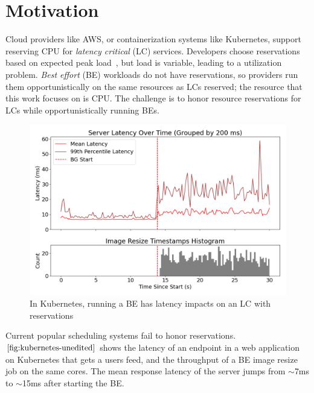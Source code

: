 \section{Motivation}

Cloud providers like AWS, or containerization systems like Kubernetes, support
reserving CPU for \textit{latency critical} (LC) services. Developers choose
reservations based on expected peak load~\cite{borg, nu, overprovision}, but
load is variable, leading to a utilization problem. \textit{Best effort} (BE)
workloads do not have reservations, so providers run them opportunistically on
the same resources as LCs reserved; the resource that this work focuses on is
CPU. The challenge is to honor resource reservations for LCs while
opportunistically running BEs.

\begin{figure}[t]
    \centering
    \includegraphics[width=\columnwidth]{graphs/kubernetes-unedited.png}
    \caption{In Kubernetes, running a BE has latency impacts on an LC with
    reservations}\label{fig:kubernetes-unedited}
\end{figure}

Current popular scheduling systems fail to honor reservations.
$\autoref{fig:kubernetes-unedited}$ shows the latency of an endpoint in a web
application on Kubernetes that gets a users feed, and the throughput of a BE
image resize job on the same cores. The mean response latency of the server
jumps from $\sim$7ms to $\sim$15ms after starting the BE.



